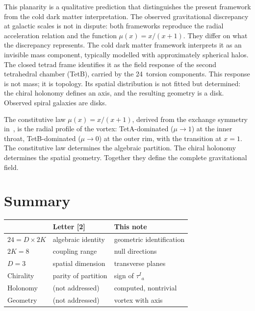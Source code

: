 \documentclass[twocolumn]{iopjournal}
\begin{document}
This planarity is a qualitative prediction that
distinguishes the present framework from the cold dark
matter interpretation.  The observed gravitational
discrepancy at galactic scales is not in dispute: both
frameworks reproduce the radial acceleration relation
and the function $\mu(x) = x/(x{+}1)$.  They differ on
what the discrepancy represents.  The cold dark matter
framework interprets it as an invisible mass component,
typically modelled with approximately spherical
halos.  The closed tetrad frame identifies it
as the field response of the second tetrahedral
chamber (TetB), carried by the 24~torsion components.
This response is not mass; it is topology.  Its spatial
distribution is not fitted but determined: the chiral
holonomy defines an axis, and the resulting geometry is
a disk.  Observed spiral galaxies are disks.

The constitutive law $\mu(x) = x/(x{+}1)$, derived from
the exchange symmetry in~\cite{Nelson2026b}, is the
radial profile of the vortex: TetA-dominated
($\mu \to 1$) at the inner throat, TetB-dominated
($\mu \to 0$) at the outer rim, with the transition at
$x = 1$.  The constitutive law determines the algebraic
partition.  The chiral holonomy determines the spatial
geometry.  Together they define the complete
gravitational field.


\section*{Summary}

\vspace{6pt}
\noindent
{\footnotesize
\begin{tabular*}{\columnwidth}{@{\extracolsep{\fill}}lll@{}}
\hline
 & Letter [2] & This note \\
\hline
$24 = D \times 2K$ & algebraic identity & geometric identification \\
$2K = 8$ & coupling range & null directions \\
$D = 3$ & spatial dimension & transverse planes \\
Chirality & parity of partition & sign of $\tau^I{}_a$ \\
Holonomy & (not addressed) & computed, nontrivial \\
Geometry & (not addressed) & vortex with axis \\
\hline
\end{tabular*}}
\vspace{6pt}
\end{document}
